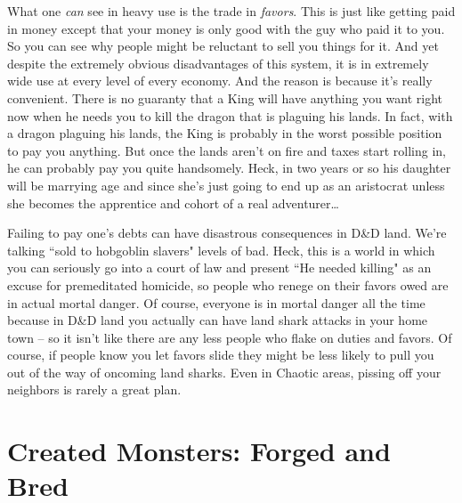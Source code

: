 What one \textit{can} see in heavy use is the trade in \textit{favors}. This is just like getting paid in money except that your money is only good with the guy who paid it to you. So you can see why people might be reluctant to sell you things for it. And yet despite the extremely obvious disadvantages of this system, it is in extremely wide use at every level of every economy. And the reason is because it's really convenient. There is no guaranty that a King will have anything you want right now when he needs you to kill the dragon that is plaguing his lands. In fact, with a dragon plaguing his lands, the King is probably in the worst possible position to pay you anything. But once the lands aren't on fire and taxes start rolling in, he can probably pay you quite handsomely. Heck, in two years or so his daughter will be marrying age and since she's just going to end up as an aristocrat unless she becomes the apprentice and cohort of a real adventurer\ldots

Failing to pay one's debts can have disastrous consequences in D\&D land. We're talking ``sold to hobgoblin slavers" levels of bad. Heck, this is a world in which you can seriously go into a court of law and present ``He needed killing" as an excuse for premeditated homicide, so people who renege on their favors owed are in actual mortal danger. Of course, everyone is in mortal danger all the time because in D\&D land you actually can have land shark attacks in your home town -- so it isn't like there are any less people who flake on duties and favors. Of course, if people know you let favors slide they might be less likely to pull you out of the way of oncoming land sharks. Even in Chaotic areas, pissing off your neighbors is rarely a great plan.


\section{Created Monsters: Forged and Bred}
\vspace*{-8pt}

